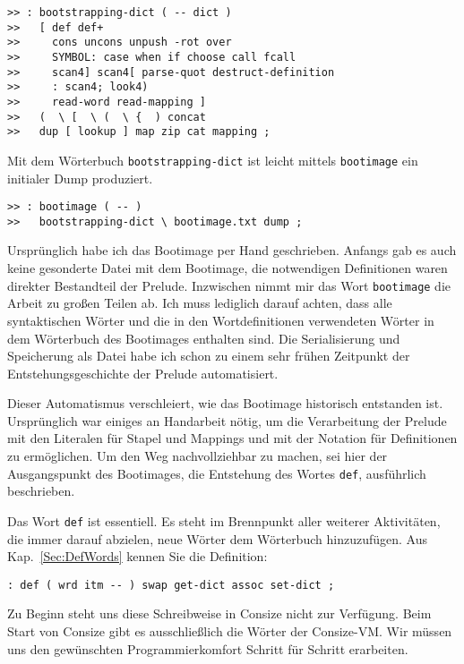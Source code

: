 \begin{verbatim}        
>> : bootstrapping-dict ( -- dict )
>>   [ def def+
>>     cons uncons unpush -rot over
>>     SYMBOL: case when if choose call fcall
>>     scan4] scan4[ parse-quot destruct-definition
>>     : scan4; look4)
>>     read-word read-mapping ]
>>   (  \ [  \ (  \ {  ) concat
>>   dup [ lookup ] map zip cat mapping ;
\end{verbatim}

Mit dem Wörterbuch \verb|bootstrapping-dict| ist leicht mittels \verb|bootimage| ein initialer Dump produziert.
 
\begin{verbatim}        
>> : bootimage ( -- )
>>   bootstrapping-dict \ bootimage.txt dump ;
\end{verbatim}

Ursprünglich habe ich das Bootimage per Hand geschrieben. Anfangs gab es auch keine gesonderte Datei mit dem Bootimage, die notwendigen Definitionen waren direkter Bestandteil der Prelude. Inzwischen nimmt mir das Wort \verb|bootimage| die Arbeit zu großen Teilen ab. Ich muss lediglich darauf achten, dass alle syntaktischen Wörter und die in den Wortdefinitionen verwendeten Wörter in dem Wörterbuch des Bootimages enthalten sind. Die Serialisierung und Speicherung als Datei habe ich schon zu einem sehr frühen Zeitpunkt der Entstehungsgeschichte der Prelude automatisiert.

Dieser Automatismus verschleiert, wie das Bootimage historisch entstanden ist. Ursprünglich war einiges an Handarbeit nötig, um die Verarbeitung der Prelude mit den Literalen für Stapel und Mappings und mit der Notation für Definitionen zu ermöglichen. Um den Weg nachvollziehbar zu machen, sei hier der Ausgangspunkt des Bootimages, die Entstehung des Wortes \verb|def|, ausführlich beschrieben.

Das Wort \verb|def| ist essentiell. Es steht im Brennpunkt aller weiterer Aktivitäten, die immer darauf abzielen, neue Wörter dem Wörterbuch hinzuzufügen. Aus Kap.~\ref{Sec:DefWords} kennen Sie die Definition:

\begin{verbatim}
: def ( wrd itm -- ) swap get-dict assoc set-dict ;
\end{verbatim}

Zu Beginn steht uns diese Schreibweise in Consize nicht zur Verfügung. Beim Start von Consize gibt es ausschließlich die Wörter der Consize-VM. Wir müssen uns den gewünschten Programmierkomfort Schritt für Schritt erarbeiten.

